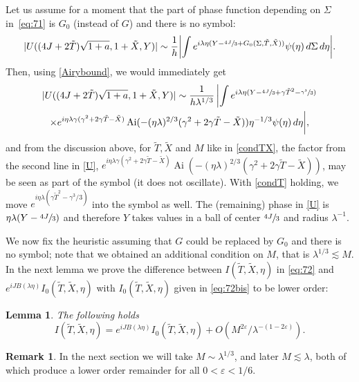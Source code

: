 \documentclass[JEP,XML,SOM,Unicode,NoEqCountersInSection,NoFloatCountersInSection,published]{cedram}
\let\epsilon\varepsilon
\DeclareMathOperator{\Ai}{Ai}
\theoremstyle{plain}
\newtheorem{lemma}{Lemma}
\theoremstyle{definition}
\newtheorem{rmq}{Remark}[section]
\begin{document}
Let us assume for a moment that the part of phase function depending on $\Sigma$ in~\eqref{eq:71} is $G_0$ (instead of $G$) and there is no symbol: 
\[
|U((4J+2\tilde T)\sqrt{1+a},1+\tilde X,Y)| \sim \frac 1h \biggl| \int e^{i\lambda\eta (Y-\sfrac{4J}{3}+G_0(\Sigma,\tilde T,\tilde X))}\psi(\eta) \,d\Sigma \,d\eta \biggr|.
\]
Then, using \eqref{Airybound}, we would immediately get
\begin{multline}\label{U}
|U((4J+2\tilde T)\sqrt{1+a},1+\tilde X,Y)|\sim \frac{1}{h\lambda^{1/3}}\,\biggl|\int e^{i\lambda\eta (Y-\sfrac{4J}{3}+\gamma \tilde T^2-\sfrac{\gamma^3}{3})}\\\times e^{i\eta \lambda \gamma(\gamma^2+2\gamma \tilde T-\tilde X)}\Ai(-(\eta\lambda)^{2/3}(\gamma^2+2\gamma \tilde T-\tilde X))\eta^{-1/3}\psi(\eta)\,d\eta\biggr|,
\end{multline}
and from the discussion above, for $\tilde T,\tilde X$ and $M$ like in \eqref{condTX}, the factor from the second line in \eqref{U},
$e^{i\eta \lambda \gamma(\gamma^2+2\gamma \tilde T-\tilde X)}\Ai(-(\eta\lambda)^{2/3}(\gamma^2+2\gamma \tilde T-\tilde X))$, may be seen as part of the symbol (it does not oscillate). With \eqref{condT} holding, we move $e^{i\eta \lambda(\gamma \tilde T^2-\gamma^3/3)}$ into the symbol as well.
The (remaining) phase in \eqref{U} is $\eta \lambda (Y-\sfrac{4J}{3})$ and therefore $Y$ takes values in a ball of center $\sfrac{4J}{3}$ and radius $\lambda^{-1}$.

We now fix the heuristic assuming that $G$ could be replaced by $G_0$ and there is no symbol; note that we obtained an additional condition on $M$, that is $\lambda^{1/3}\lesssim M$. In the next lemma we prove the difference between $I(\tilde T,\tilde X,\eta)$ in \eqref{eq:72} and $e^{iJB(\lambda\eta)} I_0(\tilde T,\tilde X,\eta)$ with $I_0(\tilde T,\tilde X,\eta)$ given in \eqref{eq:72bis} to be lower order:
\begin{lemma}
The following holds
\[
I(\tilde T,\tilde X,\eta)=e^{iJB(\lambda\eta)}I_0(\tilde T,\tilde X,\eta)+O(M^{2\epsilon}/\lambda^{-(1-2\epsilon)}).
\]
\end{lemma}
\begin{rmq}
In the next section we will take $M\sim \lambda^{1/3}$, and later $M\lesssim \lambda$, both of which produce a lower order remainder for all $0<\epsilon<1/6$.
\end{rmq}
\end{document}
